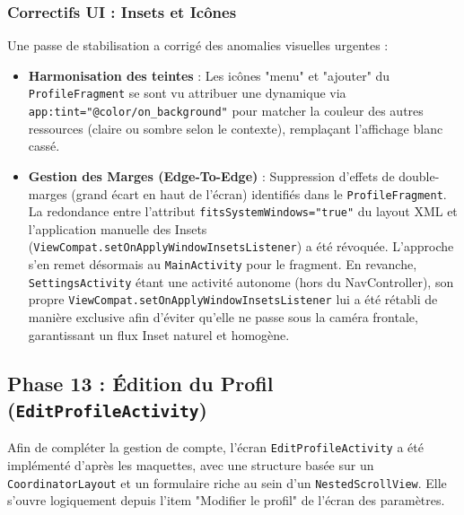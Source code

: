 \documentclass{article}
\begin{document}
\subsubsection{Correctifs UI : Insets et Icônes}
Une passe de stabilisation a corrigé des anomalies visuelles urgentes :
\begin{itemize}
    \item \textbf{Harmonisation des teintes} : Les icônes "menu" et "ajouter" du \texttt{ProfileFragment} se sont vu attribuer une dynamique via \texttt{app:tint="@color/on\_background"} pour matcher la couleur des autres ressources (claire ou sombre selon le contexte), remplaçant l'affichage blanc cassé.
    \item \textbf{Gestion des Marges (Edge-To-Edge)} : Suppression d'effets de double-marges (grand écart en haut de l'écran) identifiés dans le \texttt{ProfileFragment}. La redondance entre l'attribut \texttt{fitsSystemWindows="true"} du layout XML et l'application manuelle des Insets (\texttt{ViewCompat.setOnApplyWindowInsetsListener}) a été révoquée. L'approche s'en remet désormais au \texttt{MainActivity} pour le fragment. En revanche, \texttt{SettingsActivity} étant une activité autonome (hors du NavController), son propre \texttt{ViewCompat.setOnApplyWindowInsetsListener} lui a été rétabli de manière exclusive afin d'éviter qu'elle ne passe sous la caméra frontale, garantissant un flux Inset naturel et homogène.
\end{itemize}

\subsection{Phase 13 : Édition du Profil (\texttt{EditProfileActivity})}
Afin de compléter la gestion de compte, l'écran \texttt{EditProfileActivity} a été implémenté d'après les maquettes, avec une structure basée sur un \texttt{CoordinatorLayout} et un formulaire riche au sein d'un \texttt{NestedScrollView}. Elle s'ouvre logiquement depuis l'item "Modifier le profil" de l'écran des paramètres.
\end{document}
